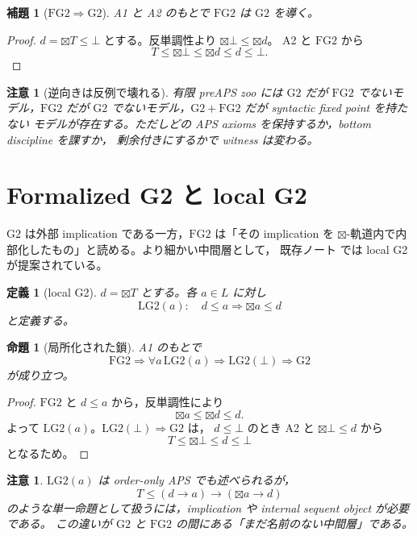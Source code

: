 ﻿\documentclass[a4paper,10pt]{ltjsarticle}
\newtheorem{proposition}[theorem]{命題}
\newtheorem{lemma}[theorem]{補題}
\newtheorem{definition}[theorem]{定義}
\newtheorem{remark}[theorem]{注意}
\newcommand{\Gtwo}{\mathrm{G2}}
\newcommand{\FGtwo}{\mathrm{FG2}}
\newcommand{\Btx}{\boxtimes}
\newcommand{\Top}{T}
\newcommand{\Bot}{\bot}
\begin{document}
\begin{lemma}[\(\FGtwo\Rightarrow\Gtwo\)]
A1 と A2 のもとで \(\FGtwo\) は \(\Gtwo\) を導く。
\end{lemma}

\begin{proof}
\(d=\Btx\Top\le\Bot\) とする。反単調性より \(\Btx\Bot\le\Btx d\)。
A2 と \(\FGtwo\) から
\[
\Top\le\Btx\Bot\le\Btx d\le d\le\Bot.
\]
\end{proof}

\begin{remark}[逆向きは反例で壊れる]
有限 preAPS zoo には \(\Gtwo\) だが \(\FGtwo\) でないモデル，\(\FGtwo\) だが
\(\Gtwo\) でないモデル，\(\Gtwo+\FGtwo\) だが syntactic fixed point を持たない
モデルが存在する。ただしどの APS axioms を保持するか，bottom discipline を課すか，
剰余付きにするかで witness は変わる。
\end{remark}

\section{Formalized G2 と local G2}

\(\Gtwo\) は外部 implication である一方，\(\FGtwo\) は「その implication を
\(\Btx\)-軌道内で内部化したもの」と読める。より細かい中間層として，
既存ノート  では
local G2 が提案されている。

\begin{definition}[local G2]
\(d=\Btx\Top\) とする。各 \(a\in L\) に対し
\[
\mathrm{LG2}(a):\quad d\le a\Rightarrow \Btx a\le d
\]
と定義する。
\end{definition}

\begin{proposition}[局所化された鎖]
A1 のもとで
\[
\FGtwo
\Rightarrow
\forall a\,\mathrm{LG2}(a)
\Rightarrow
\mathrm{LG2}(\Bot)
\Rightarrow
\Gtwo
\]
が成り立つ。
\end{proposition}

\begin{proof}
\(\FGtwo\) と \(d\le a\) から，反単調性により
\[
\Btx a\le \Btx d\le d.
\]
よって \(\mathrm{LG2}(a)\)。\(\mathrm{LG2}(\Bot)\Rightarrow\Gtwo\) は，
\(d\le\Bot\) のとき A2 と \(\Btx\Bot\le d\) から
\[
\Top\le\Btx\Bot\le d\le\Bot
\]
となるため。
\end{proof}

\begin{remark}
\(\mathrm{LG2}(a)\) は order-only APS でも述べられるが，
\[
\Top\le (d\to a)\to(\Btx a\to d)
\]
のような単一命題として扱うには，implication や internal sequent object が必要である。
この違いが \(\Gtwo\) と \(\FGtwo\) の間にある「まだ名前のない中間層」である。
\end{remark}
\end{document}
